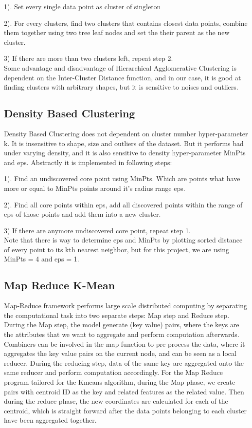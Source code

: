 \documentclass[fleqn]{llncs}
\begin{document}
1). Set every single data point as cluster of singleton

2). For every clusters, find two clusters that contains closest data points, combine them together using two tree leaf nodes and set the their parent as the new cluster.

3) If there are more than two clusters left, repeat step 2.\\
Some advantage and disadvantage of Hierarchical Agglomerative Clustering is dependent on the Inter-Cluster Distance function, and in our case, it is good at finding clusters with arbitrary shapes, but it is sensitive to noises and outliers. 

\subsection{Density Based Clustering}
Density Based Clustering does not dependent on cluster number hyper-parameter k. It is insensitive to shape, size and outliers of the dataset. But it performs bad under varying density, and it is also sensitive to density hyper-parameter MinPts and eps. Abstractly it is implemented in following steps:

1). Find an undiscovered core point using MinPts. Which are points what have more or equal to MinPts points around it's radius range eps.

2). Find all core points within eps, add all discovered points within the range of eps of those points and add them into a new cluster.

3) If there are anymore undiscovered core point, repeat step 1.\\
Note that there is way to determine eps and MinPts by plotting sorted distance of every point to its kth nearest neighbor, but for this project, we are using MinPts = 4 and eps = 1.


\subsection{Map Reduce K-Mean}
Map-Reduce framework performs large scale distributed computing by separating the computational task into two separate steps: Map step and Reduce step. During the Map step, the model generate (key value) pairs, where the keys are the attributes that we want to aggregate and perform computation afterwards. Combiners can be involved in the map function to pre-process the data, where it aggregates the key value pairs on the current node, and can be seen as a local reducer. During the reducing step, data of the same key are aggregated onto the same reducer and perform computation accordingly. For the Map Reduce program tailored for the Kmeans algorithm, during the Map phase, we create pairs with centroid ID as the key and related features as the related value. Then during the reduce phase, the new coordinates are calculated for each of the centroid, which is straight forward after the data points belonging to each cluster have been aggregated together. 
\end{document}
